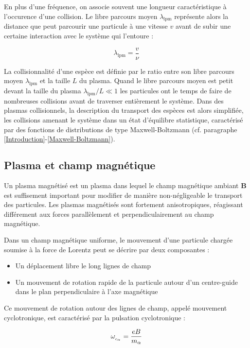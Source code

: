 \begin{refsection}
En plus d'une fréquence, on associe souvent une longueur caractéristique
à l'occurence d'une collision. Le libre parcours moyen $\lambda_\text{lpm}$
représente alors la distance que peut parcourir une particule à une vitesse
$v$ avant de subir une certaine interaction avec le système qui l'entoure :

\begin{equation}
	\lambda_\text{lpm}=\frac{v}{\nu}
\end{equation} 

La collisionnalité d'une espèce est
définie par le ratio entre son libre parcours moyen $\lambda_\text{lpm}$ et la
taille $L$ du plasma. Quand le libre parcours moyen est petit devant la
taille du plasma $\lambda_\text{lpm}/L\ll 1$
les particules ont le temps de faire de nombreuses collisions avant de
traverser entièrement le système. Dans des plasmas collisionnels, la description
du transport des espèces est alors simplifiée, les collisions amenant le système dans un état
d'équilibre statistique, caractérisé par des fonctions de distributions de
type Maxwell-Boltzmann (cf. paragraphe \ref{Introduction}-\ref{Maxwell-Boltzmann}).

\subsection{Plasma et champ magnétique} 
Un plasma magnétisé est un plasma dans lequel le champ magnétique ambiant
$\mathbf{B}$ est suffisement important pour modifier de manière non-négligeable
le transport des particules. Les plasmas magnétisés sont fortement
anisotropiques, réagissant différement aux forces parallèlement et
perpendiculairement au champ magnétique.

Dans un champ magnétique uniforme, le mouvement d'une particule chargée
soumise à la force de Lorentz peut se décrire par deux composantes :

\begin{itemize}
  \item Un déplacement libre le long lignes de champ
  \item Un mouvement de rotation rapide de la particule
  autour d'un centre-guide dans le plan perpendiculaire à l'axe magnétique
\end{itemize}

Ce mouvement de rotation autour des lignes de champ, appelé mouvement
cyclotronique, est caractérisé par la pulsation cyclotronique : 

\begin{equation}
\omega_{_{c_{\alpha}}}=\frac{e B}{m_\alpha}
\end{equation}


\end{refsection}

